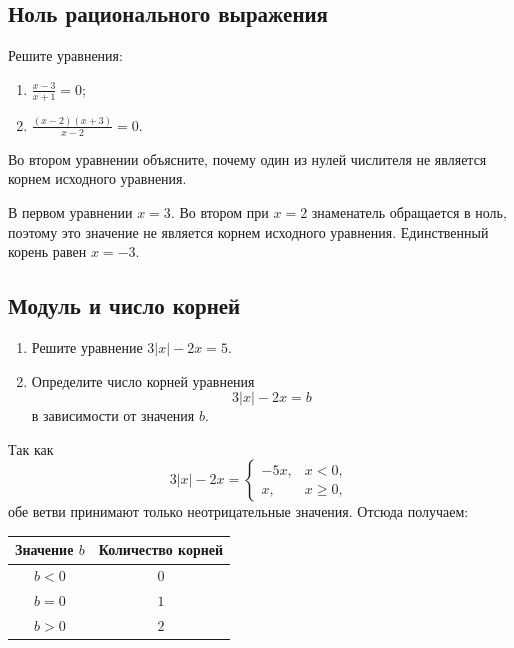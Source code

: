 \subsection{Ноль рационального выражения}

\begin{trainingtask}
  Решите уравнения:
  \begin{enumerate}
    \item \(\displaystyle \frac{x-3}{x+1}=0;\)
    \item \(\displaystyle \frac{(x-2)(x+3)}{x-2}=0.\)
  \end{enumerate}
  Во втором уравнении объясните, почему один из нулей числителя не является
  корнем исходного уравнения.
\end{trainingtask}

\begin{notebox}[Проверка]
  В первом уравнении \(x=3\). Во втором при \(x=2\) знаменатель обращается
  в ноль, поэтому это значение не является корнем исходного уравнения.
  Единственный корень равен \(x=-3\).
\end{notebox}

\subsection{Модуль и число корней}

\begin{trainingtask}
  \begin{enumerate}
    \item Решите уравнение \(3|x|-2x=5\).
    \item Определите число корней уравнения
      \[
        3|x|-2x=b
      \]
      в зависимости от значения \(b\).
  \end{enumerate}
\end{trainingtask}

Так как
\[
  3|x|-2x=
  \begin{cases}
    -5x, & x<0,\\
    x, & x\ge 0,
  \end{cases}
\]
обе ветви принимают только неотрицательные значения. Отсюда получаем:

\begin{center}
  \renewcommand{\arraystretch}{1.28}
  \begin{tabular}{cc}
    \toprule
    \rowcolor{TableHeader}
    Значение \(b\) & Количество корней \\
    \midrule
    \(b<0\) & \(0\) \\
    \(b=0\) & \(1\) \\
    \(b>0\) & \(2\) \\
    \bottomrule
  \end{tabular}
\end{center}

